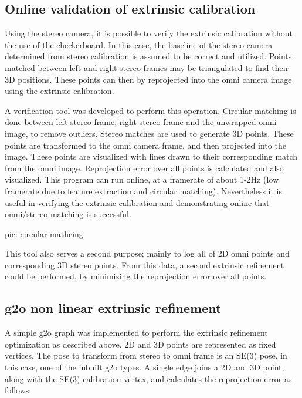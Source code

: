 

\subsection{Online validation of extrinsic calibration}

Using the stereo camera, it is possible to verify the extrinsic calibration without the use of the checkerboard.  In this case, the baseline of the stereo camera determined from stereo calibration is assumed to be correct and utilized.  Points matched between left and right stereo frames may be triangulated to find their 3D positions.  These points can then by reprojected into the omni camera image using the extrinsic calibration.

A verification tool was developed to perform this operation.  Circular matching is done between left stereo frame, right stereo frame and the unwrapped omni image, to remove outliers.  Stereo matches are used to generate 3D points.  These points are transformed to the omni camera frame, and then projected into the image.  These points are visualized with lines drawn to their corresponding match from the omni image.  Reprojection error over all points is calculated and also visualized.  This program can run online, at a framerate of about 1-2Hz (low framerate due to feature extraction and circular matching).  Nevertheless it is useful in verifying the extrinsic calibration and demonstrating online that omni/stereo matching is successful.

pic: circular mathcing

This tool also serves a second purpose; mainly to log all of 2D omni points and corresponding 3D stereo points.  From this data, a second extrinsic refinement could be performed, by minimizing the reprojection error over all points.

\subsection{g2o non linear extrinsic refinement}

A simple g2o graph was implemented to perform the extrinsic refinement optimization as described above.  2D and 3D points are represented as fixed vertices.  The pose to transform from stereo to omni frame is an SE(3) pose, in this case, one of the inbuilt g2o types.  A single edge joins a 2D and 3D point, along with the SE(3) calibration vertex, and calculates the reprojection error as follows:

